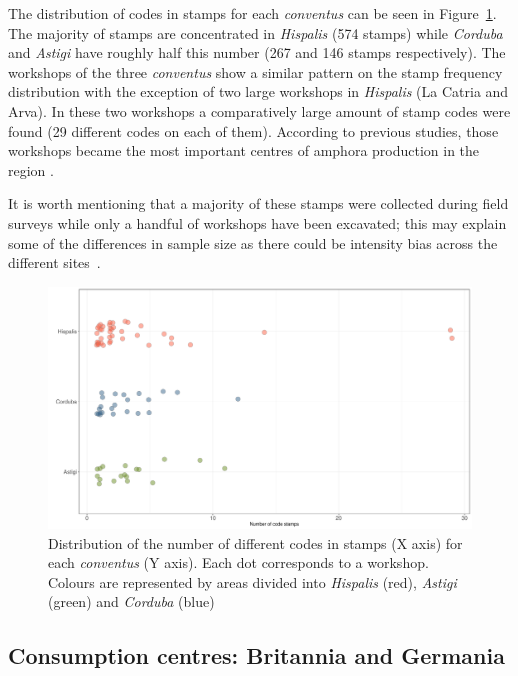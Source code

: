The distribution of codes in stamps for each \textit{conventus} can be seen in Figure~\ref{frequency}. The majority of stamps are concentrated in \textit{Hispalis} (574 stamps) while \textit{Corduba} and \textit{Astigi} have roughly half this number (267 and 146 stamps respectively). The workshops of the three \textit{conventus} show a similar pattern on the stamp frequency distribution with the exception of two large workshops in \textit{Hispalis} (La Catria and Arva). In these two workshops a comparatively large amount of stamp codes were found (29 different codes on each of them). According to previous studies, those workshops became the most important centres of amphora production in the region \citep{rodriguez_economioleicola_1977,arva_1997}.

It is worth mentioning that a majority of these stamps were collected during field surveys while only a handful of workshops have been excavated; this may explain some of the differences in sample size as there could be intensity bias across the different sites~\citep{arva_1997}.
 
\begin{figure}[htp]
	\centering
\includegraphics[width=\linewidth]{frequency}
\caption{Distribution of the number of different codes in stamps (X axis) for each \textit{conventus} (Y axis). Each dot corresponds to a workshop. Colours are represented by areas divided into \textit{Hispalis} (red), \textit{Astigi} (green) and \textit{Corduba} (blue)}
\label{frequency}
\end{figure} 


\subsection{Consumption centres: Britannia and Germania}
\label{sec:5}


